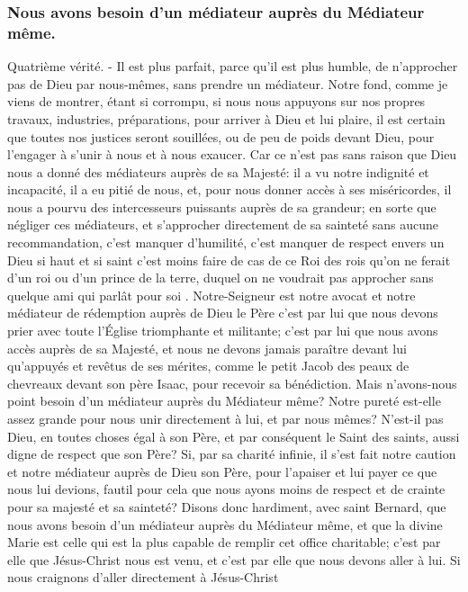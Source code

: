 \subsubsection{Nous avons besoin d'un médiateur auprès du Médiateur même.}
 Quatrième vérité. - Il est plus parfait, parce qu'il est plus humble, de n'approcher pas de Dieu par nous-mêmes, sans prendre un médiateur. Notre fond, comme je viens de montrer, étant si corrompu, si nous nous
appuyons sur nos propres travaux, industries, préparations, pour arriver à Dieu et lui plaire, il est certain que toutes
nos justices seront souillées, ou de peu de poids devant Dieu, pour l'engager à s'unir à nous et à nous exaucer.
Car ce n'est pas sans raison que Dieu nous a donné des médiateurs auprès de sa Majesté: il a vu notre indignité
et incapacité, il a eu pitié de nous, et, pour nous donner accès à ses miséricordes, il nous a pourvu des
intercesseurs puissants auprès de sa grandeur; en sorte que négliger ces médiateurs, et s'approcher directement
de sa sainteté sans aucune recommandation, c'est manquer d'humilité, c'est manquer de respect envers un Dieu
si haut et si saint c'est moins faire de cas de ce Roi des rois qu'on ne ferait d'un roi ou d'un prince de la terre,
duquel on ne voudrait pas approcher sans quelque ami qui parlât pour soi .
 Notre-Seigneur est notre avocat et notre médiateur de rédemption auprès de Dieu le Père c'est par lui que
nous devons prier avec toute l'Église triomphante et militante; c'est par lui que nous avons accès auprès de sa
Majesté, et nous ne devons jamais paraître devant lui qu'appuyés et revêtus de ses mérites, comme le petit Jacob
des peaux de chevreaux devant son père Isaac, pour recevoir sa bénédiction.
 Mais n'avons-nous point besoin d'un médiateur auprès du Médiateur même? Notre pureté est-elle assez
grande pour nous unir directement à lui, et par nous mêmes? N'est-il pas Dieu, en toutes choses égal à son Père,
et par conséquent le Saint des saints, aussi digne de respect que son Père? Si, par sa charité infinie, il s'est fait
notre caution et notre médiateur auprès de Dieu son Père, pour l'apaiser et lui payer ce que nous lui devions, fautil pour cela que nous ayons moins de respect et de crainte pour sa majesté et sa sainteté?
Disons donc hardiment, avec saint Bernard, que nous avons besoin d'un médiateur auprès du Médiateur même, et
que la divine Marie est celle qui est la plus capable de remplir cet office charitable; c'est par elle que Jésus-Christ
nous est venu, et c'est par elle que nous devons aller à lui. Si nous craignons d'aller directement à Jésus-Christ
